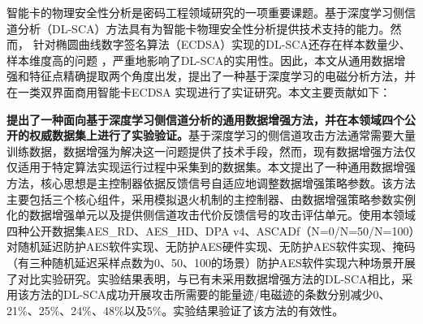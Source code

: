 %

智能卡的物理安全性分析是密码工程领域研究的一项重要课题。基于深度学习侧信道分析（DL-SCA）方法具有为智能卡物理安全性分析提供技术支持的能力。然而，%
针对椭圆曲线数字签名算法（ECDSA）实现的DL-SCA还存在样本数量少、样本维度高的问题
，严重地影响了DL-SCA的实用性。因此，本文从通用数据增强和特征点精确提取两个角度出发，提出了一种基于深度学习的电磁分析方法，并在一类双界面商用智能卡ECDSA 实现进行了实证研究。本文主要贡献如下：

\textbf{提出了一种面向基于深度学习侧信道分析的通用数据增强方法，并在本领域四个公开的权威数据集上进行了实验验证。}基于深度学习的侧信道攻击方法通常需要大量训练数据，数据增强为解决这一问题提供了技术手段，然而，现有数据增强方法仅仅适用于特定算法实现运行过程中采集到的数据集。本文提出了一种通用数据增强方法，核心思想是主控制器依据反馈信号自适应地调整数据增强策略参数。该方法主要包括三个核心组件，采用模拟退火机制的主控制器、由数据增强策略参数实例化的数据增强单元以及提供侧信道攻击代价反馈信号的攻击评估单元。使用本领域四种公开数据集AES\_RD、AES\_HD、DPA v4、ASCADf（N=0/N=50/N=100）对随机延迟防护AES软件实现、无防护AES硬件实现、无防护AES软件实现、掩码（有三种随机延迟采样点数为0、50、100的场景）防护AES软件实现六种场景开展了对比实验研究。实验结果表明，与已有未采用数据增强方法的DL-SCA相比，采用该方法的DL-SCA成功开展攻击所需要的能量迹/电磁迹的条数分别减少0、21\%、25\%、24\%、48\%以及5\%。实验结果验证了该方法的有效性。

